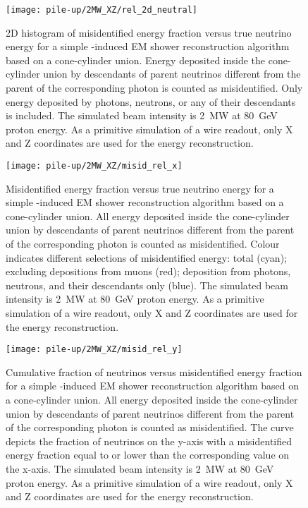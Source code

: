 \begin{figure}[htb]
	\centering
	\texttt{[image: pile-up/2MW\_XZ/rel\_2d\_neutral]}
	\caption{2D histogram of misidentified energy fraction versus true neutrino energy for a simple \Pgpz-induced EM shower reconstruction algorithm based on a cone-cylinder union.
		Energy deposited inside the cone-cylinder union by descendants of parent neutrinos different from the parent of the corresponding \Pgpz photon is counted as misidentified.
		Only energy deposited by photons, neutrons, or any of their descendants is included.
		The simulated beam intensity is \SI{2}{\mega\watt} at \SI{80}{\giga\electronvolt} proton energy.
		As a primitive simulation of a wire readout, only X and Z coordinates are used for the energy reconstruction.}
\end{figure}

\begin{figure}[htb]
	\centering
	\texttt{[image: pile-up/2MW\_XZ/misid\_rel\_x]}
	\caption{Misidentified energy fraction versus true neutrino energy for a simple \Pgpz-induced EM shower reconstruction algorithm based on a cone-cylinder union.
		All energy deposited inside the cone-cylinder union by descendants of parent neutrinos different from the parent of the corresponding \Pgpz photon is counted as misidentified.
		Colour indicates different selections of misidentified energy: total (cyan); excluding depositions from muons (red); deposition from photons, neutrons, and their descendants only (blue).
		The simulated beam intensity is \SI{2}{\mega\watt} at \SI{80}{\giga\electronvolt} proton energy.
		As a primitive simulation of a wire readout, only X and Z coordinates are used for the energy reconstruction.}
\end{figure}

\begin{figure}[htb]
	\centering
	\texttt{[image: pile-up/2MW\_XZ/misid\_rel\_y]}
	\caption{Cumulative fraction of neutrinos versus misidentified energy fraction for a simple \Pgpz-induced EM shower reconstruction algorithm based on a cone-cylinder union.
		All energy deposited inside the cone-cylinder union by descendants of parent neutrinos different from the parent of the corresponding \Pgpz photon is counted as misidentified.
		The curve depicts the fraction of neutrinos on the y-axis with a misidentified energy fraction equal to or lower than the corresponding value on the x-axis.
		The simulated beam intensity is \SI{2}{\mega\watt} at \SI{80}{\giga\electronvolt} proton energy.
		As a primitive simulation of a wire readout, only X and Z coordinates are used for the energy reconstruction.}
\end{figure}

